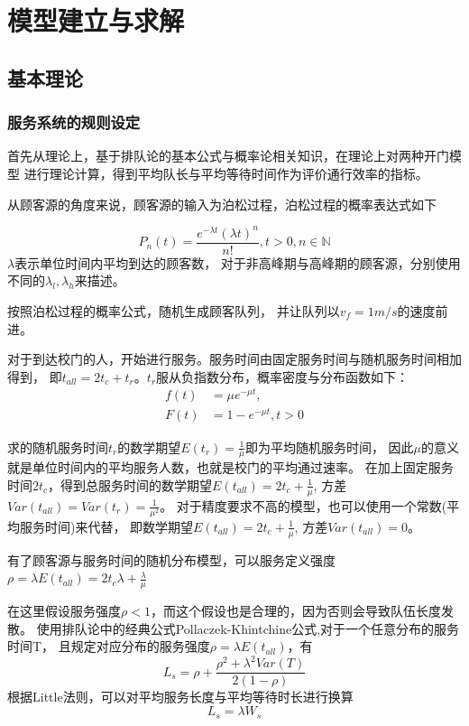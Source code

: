 \section{模型建立与求解}

\subsection{基本理论}
\subsubsection{服务系统的规则设定}
    首先从理论上，基于排队论的基本公式与概率论相关知识，在理论上对两种开门模型
    进行理论计算，得到平均队长与平均等待时间作为评价通行效率的指标。

    从顾客源的角度来说，顾客源的输入为泊松过程，泊松过程的概率表达式如下

    \begin{equation}
        P_n(t)=\frac{e^{-\lambda t}(\lambda t)^n}{n!},t>0,n \in \mathbb{N}
    \end{equation}
    $\lambda$表示单位时间内平均到达的顾客数，
    对于非高峰期与高峰期的顾客源，分别使用不同的$\lambda_l,\lambda_h$来描述。

    按照泊松过程的概率公式，随机生成顾客队列，
    并让队列以$v_f=1 m/s$的速度前进。

    对于到达校门的人，开始进行服务。服务时间由固定服务时间与随机服务时间相加得到，
    即$t_{all}=2t_{c}+t_{r}$。$t_r$服从负指数分布，概率密度与分布函数如下：
    \begin{equation}
        \begin{aligned}
            f(t) &=\mu e^{-\mu t},  \\
            F(t) &=1-e^{-\mu t},t>0
        \end{aligned}
    \end{equation}

    求的随机服务时间$t_r$的数学期望$E(t_r)=\frac{1}{\mu}$即为平均随机服务时间，
    因此$\mu$的意义就是单位时间内的平均服务人数，也就是校门的平均通过速率。
    在加上固定服务时间$2t_c$，得到总服务时间的数学期望$E(t_{all})=2t_c+\frac{1}{\mu}$,
    方差$ Var(t_{all})=Var(t_r)=\frac{1}{\mu^2}$。
    对于精度要求不高的模型，也可以使用一个常数(平均服务时间)来代替，
    即数学期望$E(t_{all})=2t_c+\frac{1}{\mu}$,
    方差$ Var(t_{all})=0$。

    有了顾客源与服务时间的随机分布模型，可以服务定义强度
    $\rho=\lambda E(t_{all})=2t_c \lambda+\frac{\lambda}{\mu}$

    在这里假设服务强度$\rho<1$，而这个假设也是合理的，因为否则会导致队伍长度发散。
    使用排队论中的经典公式Pollaczek-Khintchine公式,对于一个任意分布的服务时间T，
    且规定对应分布的服务强度$\rho=\lambda E(t_{all})$，有
    \begin{equation}
        L_s=\rho +\frac{\rho^2 +\lambda^2 Var(T)}{2(1-\rho)}
    \end{equation}
    根据Little法则，可以对平均服务长度与平均等待时长进行换算
    \begin{equation}
        L_s=\lambda W_s
    \end{equation}

